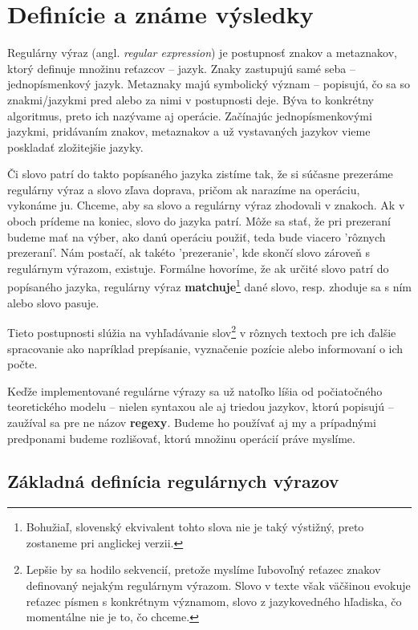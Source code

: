 \chapter{Definície a známe výsledky}
\label{chap:kapitola1}

Regulárny výraz (angl. \textit{regular expression}) je postupnosť znakov a metaznakov, ktorý definuje množinu reťazcov -- jazyk. Znaky zastupujú samé seba -- jednopísmenkový jazyk. Metaznaky majú symbolický význam -- popisujú, čo sa so znakmi/jazykmi pred alebo za nimi v postupnosti deje. Býva to konkrétny algoritmus, preto ich nazývame aj operácie. Začínajúc jednopísmenkovými jazykmi, pridávaním znakov, metaznakov a už vystavaných jazykov vieme poskladať zložitejšie jazyky.

Či slovo patrí do takto popísaného jazyka zistíme tak, že si súčasne prezeráme re\-gu\-lár\-ny výraz a slovo zľava doprava, pričom ak narazíme na operáciu, vykonáme ju. Chceme, aby sa slovo a regulárny výraz zhodovali v znakoch. Ak v oboch prídeme na koniec, slovo do jazyka patrí. Môže sa stať, že pri prezeraní budeme mať na výber, ako danú operáciu použiť, teda bude viacero 'rôznych prezeraní'. Nám postačí, ak takéto 'prezeranie', kde skončí slovo zároveň s regulárnym výrazom, existuje. Formálne ho\-vo\-rí\-me, že ak určité slovo patrí do popísaného jazyka, regulárny výraz \textbf{matchuje}\footnote{Bohužiaľ, slovenský ekvivalent tohto slova nie je taký výstižný, preto zostaneme pri anglickej verzii.} dané slovo, resp. zhoduje sa s ním alebo slovo pasuje.

Tieto postupnosti slúžia na vyhľadávanie slov\footnote{Lepšie by sa hodilo sekvencií, pretože myslíme ľubovoľný reťazec znakov definovaný nejakým regulárnym výrazom. Slovo v texte však väčšinou evokuje reťazec písmen s konkrétnym významom, slovo z jazykovedného hľadiska, čo momentálne nie je to, čo chceme.} v rôznych textoch pre ich ďalšie spracovanie ako napríklad prepísanie, vyznačenie pozície alebo informovaní o ich počte.

Keďže implementované regulárne výrazy sa už natoľko líšia od počiatočného teoretického modelu -- nielen syntaxou ale aj triedou jazykov, ktorú popisujú -- zaužíval sa pre ne názov \textbf{regexy}. Budeme ho používať aj my a prípadnými predponami budeme rozlišovať, ktorú množinu operácií práve myslíme.

\section[Zákl. definícia]{Základná definícia regulárnych výrazov}
\label{def}

